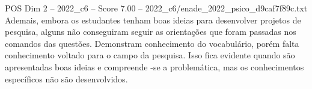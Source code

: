 \begin{textsample}{POS Dim 2 – 2022\_c6 – Score 7.00 – 2022\_c6/enade\_2022\_psico\_d9caf7f89c.txt}
Ademais, embora os estudantes tenham boas ideias para desenvolver projetos de pesquisa, alguns não conseguiram seguir as orientações que foram passadas nos comandos das questões.
Demonstram conhecimento do vocabulário, porém falta conhecimento voltado para o campo da pesquisa.
Isso fica evidente quando são apresentadas boas ideias e compreende -se a problemática, mas os conhecimentos específicos não são desenvolvidos.

\end{textsample}
